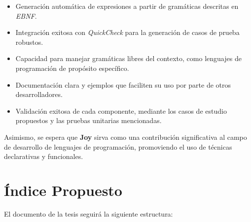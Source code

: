 \documentclass[11pt]{article}
\begin{document}
\begin{itemize}
\item Generación automática de expresiones a partir de gramáticas descritas en \textit{EBNF}.
\item Integración exitosa con \textit{QuickCheck} para la generación de casos de prueba robustos.
\item Capacidad para manejar gramáticas libres del contexto, como lenguajes de programación de propósito específico.
\item Documentación clara y ejemplos que faciliten su uso por parte de otros desarrolladores.
\item Validación exitosa de cada componente, mediante los casos de estudio propuestos y las pruebas unitarias mencionadas.
\end{itemize}

Asimismo, se espera que \textbf{Joy} sirva como una contribución significativa al campo de desarrollo de lenguajes de programación, promoviendo el uso de técnicas declarativas y funcionales.

\section*{Índice Propuesto}

El documento de la tesis seguirá la siguiente estructura:
\end{document}
